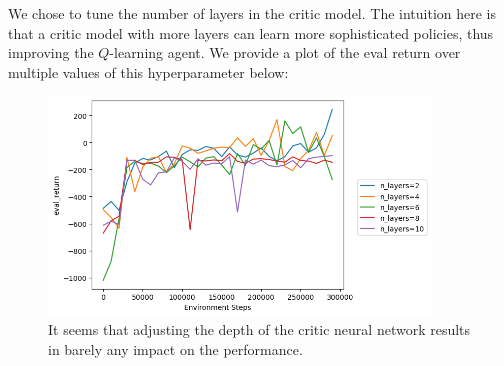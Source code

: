 \begin{sol}
    We chose to tune the number of layers in the critic model. The intuition here is that a critic model with more layers can learn more sophisticated policies, thus improving the $Q$-learning agent. We provide a plot of the eval return over multiple values of this hyperparameter below:
    \begin{figure}[!ht]
    \begin{center}
        \includegraphics[width=4in]{../q2.6_lunarlander_tuning.png}
    \end{center}
    \caption{It seems that adjusting the depth of the critic neural network results in barely any impact on the performance. }
\end{figure}
\end{sol}
